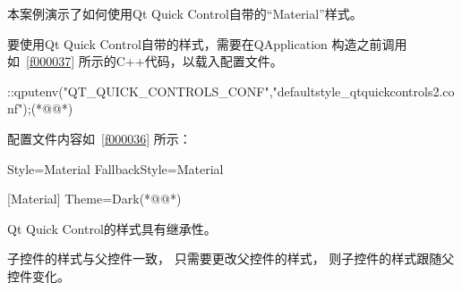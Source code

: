 本案例演示了如何使用Qt Quick Control自带的“Material”样式。

要使用Qt Quick Control自带的样式，需要在QApplication
构造之前调用如\filesourcenumbernameone\ \ref{f000037}
所示的C{\sourcefonttwo{}+}{\sourcefonttwo{}+}代码，以载入配置文件。

\label{f000037}    %
\FloatBarrier                                  %
\begin{thebookfilesourceone}[escapeinside={(*@}{@*)},
caption=GoodLuck,
title=\filesourcenumbernameone \thefilesourcenumber
]
::qputenv("QT_QUICK_CONTROLS_CONF","defaultstyle_qtquickcontrols2.conf");(*@\marginpar[\hfill\setlength\fboxsep{2pt}\fbox{\footnotesize{\kaishu\parbox{1em}{\setlength{\baselineskip}{2pt}\filesourcenumbernameone}}\footnotesize{\thefilesourcenumber}}]{\setlength\fboxsep{2pt}\fbox{\footnotesize{\kaishu\parbox{1em}{\setlength{\baselineskip}{2pt}\filesourcenumbernameone}}\footnotesize{\thefilesourcenumber}}}@*)\end{thebookfilesourceone}          %
\addtocounter{lstlisting}{-1}   %


配置文件内容如\filesourcenumbernameone\ \ref{f000036}
所示：
\label{f000036}    %
\FloatBarrier                                  %
\begin{thebookfilesourceone}[escapeinside={(*@}{@*)},
caption=GoodLuck,
title=\filesourcenumbernameone \thefilesourcenumber
]
[Controls]
Style=Material
FallbackStyle=Material

[Material]
Theme=Dark(*@\marginpar[\hfill\setlength\fboxsep{2pt}\fbox{\footnotesize{\kaishu\parbox{1em}{\setlength{\baselineskip}{2pt}\filesourcenumbernameone}}\footnotesize{\thefilesourcenumber}}]{\setlength\fboxsep{2pt}\fbox{\footnotesize{\kaishu\parbox{1em}{\setlength{\baselineskip}{2pt}\filesourcenumbernameone}}\footnotesize{\thefilesourcenumber}}}@*)\end{thebookfilesourceone}          %
\addtocounter{lstlisting}{-1}   %

Qt Quick Control的样式具有继承性。

子控件的样式与父控件一致，
只需要更改父控件的样式，
则子控件的样式跟随父控件变化。















